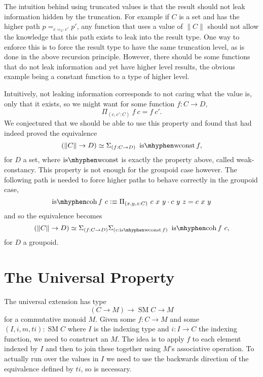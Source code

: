 \documentclass[12pt, parskip, DIV=14]{scrbook}
\newcommand{\defeq}{\vcentcolon\equiv}
\newcommand{\SM}{\operatorname{SM}}
\newcommand{\iswconst}{\operatorname{is\mhyphen wconst}}
\newcommand{\iscoh}{\operatorname{is\mhyphen coh}}
\begin{document}
The intuition behind using truncated values is that the result should not leak information hidden by the truncation. For example if $C$ is a set and has the higher path $p =_{c =_C c'} p'$, any function that uses a value of $\| C \|$ should not allow the knowledge that this path exists to leak into the result type. One way to enforce this is to force the result type to have the same truncation level, as is done in the above recursion principle. However, there should be some functions that do not leak information and yet have higher level results, the obvious example being a constant function to a type of higher level.

Intuitively, not leaking information corresponds to not caring what the value is, only that it exists, so we might want for some function $f : C \to D$,
\begin{equation}
\label{eqn:wconst}
\Pi_{(c, c' : C)}~f~c = f~c'.
\end{equation}
We conjectured that we should be able to use this property and found that \citet{kraus2014general} had indeed proved the equivalence
$$(\| C \| \to D) \simeq \Sigma_{(f : C \to D)}~\iswconst f,$$ for $D$ a set, where $\iswconst$ is exactly the property above, called weak-constancy. This property is not enough for the groupoid case however. The following path is needed to force higher paths to behave correctly in the groupoid case,
\begin{equation}
\label{eqn:coh}
\iscoh f~c \defeq \Pi_{(x , y , z : C)}~c~x~y \cdot c~y~z = c~x~y
\end{equation}
and so the equivalence becomes
\begin{equation}
\label{eqn:gpdequiv}
(\| C \| \to D) \simeq \Sigma_{(f : C \to D)}\Sigma_{(c : \iswconst f)}~\iscoh f~c,
\end{equation}
for $D$ a groupoid.

\section{The Universal Property}

The universal extension has type
$$(C \to M) \to \SM C \to M$$
for a commutative monoid $M$. Given some $f : C \to M$ and some $(I , i , m , ti) : \SM C$ where $I$ is the indexing type and $i : I \to C$ the indexing function, we need to construct an $M$. The idea is to apply $f$ to each element indexed by $I$ and then to join these together using $M$'s associative operation. To actually run over the values in $I$ we need to use the backwards direction of the equivalence defined by $ti$, so  is necessary.
\end{document}
